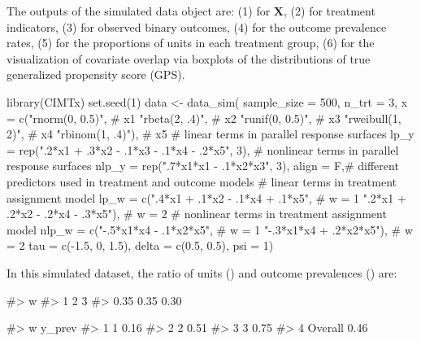 The outputs of the simulated data object are: (1)  for $\bm{X}$, (2)  for  treatment indicators, (3)  for observed binary outcomes,  (4)  for the outcome prevalence rates,   (5)  for the proportions of units in each treatment group,  (6)  for the visualization of covariate overlap via boxplots of the distributions of true generalized propensity score (GPS).

\begin{Schunk}
\begin{Sinput}
library(CIMTx)
set.seed(1)
data <- data_sim(
  sample_size = 500, n_trt = 3,
  x = c("rnorm(0, 0.5)",  # x1
        "rbeta(2, .4)",   # x2
        "runif(0, 0.5)",  # x3
        "rweibull(1, 2)", # x4
        "rbinom(1, .4)"),   # x5
  # linear terms in parallel response surfaces
  lp_y = rep(".2*x1 + .3*x2 - .1*x3 - .1*x4 - .2*x5", 3), 
  # nonlinear terms in parallel response surfaces
  nlp_y  = rep(".7*x1*x1  - .1*x2*x3", 3), 
  align = F,# different predictors used in treatment and outcome models
  # linear terms in treatment assignment model
  lp_w = c(".4*x1 + .1*x2  - .1*x4 + .1*x5",   # w = 1
           ".2*x1 + .2*x2  - .2*x4 - .3*x5"),  # w = 2
  # nonlinear terms in treatment assignment model
  nlp_w = c("-.5*x1*x4  - .1*x2*x5", # w = 1
            "-.3*x1*x4 + .2*x2*x5"), # w = 2
  tau = c(-1.5, 0, 1.5), delta = c(0.5, 0.5), psi = 1)
\end{Sinput}
\end{Schunk}

In this simulated dataset, the ratio of units () and outcome prevalences () are:

\begin{Schunk}
\begin{Soutput}
#> w
#>    1    2    3 
#> 0.35 0.35 0.30 
\end{Soutput}
\end{Schunk}


\begin{Schunk}
\begin{Soutput}
#>         w y_prev
#> 1       1   0.16
#> 2       2   0.51
#> 3       3   0.75
#> 4 Overall   0.46
\end{Soutput}
\end{Schunk}


